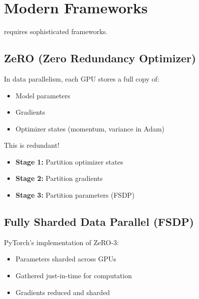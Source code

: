 \newpage
\section{Modern Frameworks}

 requires sophisticated frameworks.

\subsection{ZeRO (Zero Redundancy Optimizer)}

 In data parallelism, each GPU stores a full copy of:
\begin{itemize}
    \item Model parameters
    \item Gradients
    \item Optimizer states (momentum, variance in Adam)
\end{itemize}

This is redundant!

\begin{itemize}
    \item \textbf{Stage 1:} Partition optimizer states
    \item \textbf{Stage 2:} Partition gradients
    \item \textbf{Stage 3:} Partition parameters (FSDP)
\end{itemize}



\subsection{Fully Sharded Data Parallel (FSDP)}

PyTorch's implementation of ZeRO-3:
\begin{itemize}
    \item Parameters sharded across GPUs
    \item Gathered just-in-time for computation
    \item Gradients reduced and sharded
\end{itemize}

